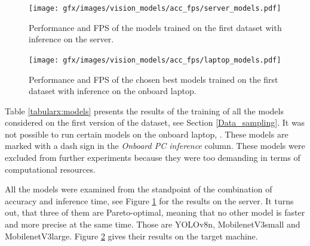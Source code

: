 \begin{description}



\begin{figure}[ht] 
    \centering
    \texttt{[image: gfx/images/vision\_models/acc\_fps/server\_models.pdf]}
    \caption{Performance and FPS of the models trained on the first dataset with inference on the server.}
    \label{fig:Firstresult}
\end{figure}
\begin{figure}[ht] 
    \centering
    \texttt{[image: gfx/images/vision\_models/acc\_fps/laptop\_models.pdf]}
    \caption{Performance and FPS of the chosen best models trained on the first dataset with inference on the onboard laptop.}
    \label{fig:Secondresult}
\end{figure}


Table \ref{tabularx:models} presents the results of the training of all the models considered on the first version of the dataset, see Section \ref{Data_sampling}.
It was not possible to run certain models on the onboard laptop, . These models are marked with a dash sign in the \textit{Onboard PC inference} column.
These models were excluded from further experiments because they were too demanding in terms of computational resources.

All the models were examined from the standpoint of the combination of accuracy and inference time, see Figure \ref{fig:Firstresult} for the results on the server.
It turns out, that three of them are Pareto-optimal, meaning that no other model is faster and more precise at the same time.
Those are YOLOv8n, MobilenetV3small and MobilenetV3large.
Figure \ref{fig:Secondresult} gives their results on the target machine.



\end{description}
